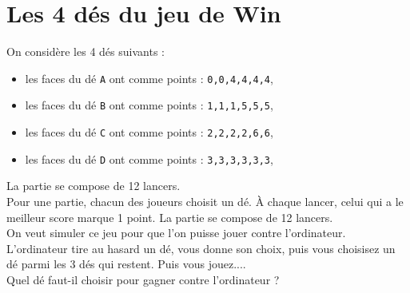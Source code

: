 \documentclass[a4paper,11pt]{book}
\begin{document}
\section{Les 4 d\'es du jeu de Win}
On consid\`ere les 4 d\'es suivants :
\begin{itemize}
\item les faces du d\'e {\tt A} ont comme points : {\tt 0,0,4,4,4,4}, 
\item les faces du d\'e {\tt B} ont comme points : {\tt 1,1,1,5,5,5},
\item les faces du d\'e {\tt C} ont comme points : {\tt 2,2,2,2,6,6},
\item les faces du d\'e {\tt D} ont comme points : {\tt 3,3,3,3,3,3},
\end{itemize}
 La partie se compose de 12 lancers.\\
Pour une partie, chacun des joueurs choisit un d\'e. \`A chaque lancer, celui
qui a le meilleur score marque 1 point. La partie se compose de 12 lancers.\\
On veut simuler ce jeu pour que l'on puisse jouer contre l'ordinateur.
L'ordinateur tire au hasard un d\'e, vous donne son choix, puis vous
choisisez un d\'e parmi les 3 d\'es qui restent. Puis vous jouez....\\
Quel d\'e faut-il choisir pour gagner contre l'ordinateur ?\\
\end{document}
